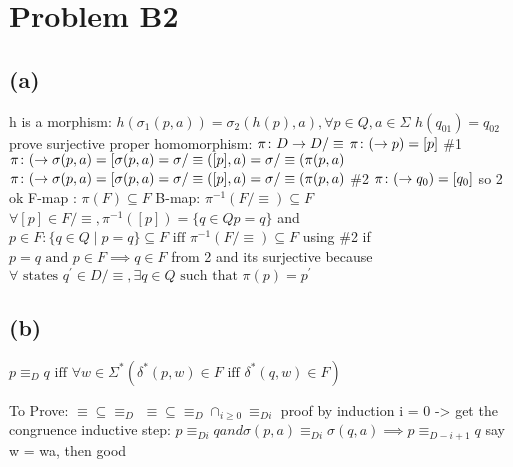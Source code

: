 \documentclass[12pt]{article}
\begin{document}
\section*{Problem B2}
\subsection*{(a)}
h is a morphism:
$h(\sigma_1(p,a)) = \sigma_2(h(p),a), \forall p \in Q, a \in \Sigma$
$h(q_01) = q_02$
prove surjective proper homomorphism:
$\pi\colon D\rightarrow D/\equiv$ \newline
$\pi\colon (\rightarrow p) = [p]$ \newline
\#1 $\pi\colon (\rightarrow \sigma(p, a) = [\sigma(p,a) = \sigma/\equiv([p], a)
= \sigma / \equiv({\pi}(p,a)$ \newline
$\pi\colon (\rightarrow \sigma(p, a) = [\sigma(p,a) = \sigma/\equiv([p], a)
= \sigma / \equiv({\pi}(p,a)$ \newline
\#2 $\pi\colon (\rightarrow q_0) = [q_0]$ so 2 ok \newline
F-map : ${\pi}(F) \subseteq F$ \newline
B-map: ${\pi}^{-1}(F/\equiv) \subseteq F$ \newline
$\forall [p] \in F/\equiv, {\pi}^{-1}([p]) =\{ q \in Q p = q\}$ \newline
and $p \in F : \{q \in Q \mid p = q\} \subseteq F \text{ iff }
{\pi}^{-1}(F/\equiv) \subseteq F$ using \#2 \newline
if $p=q \text{ and } p\in F \implies q \in F$ from 2 \newline
and its surjective because $\forall \text{ states } q^{'} \in D/\equiv,
\exists q \in Q \text{ such that } {\pi}(p) = p^{'}$ \newline

\subsection*{(b)}
$p \equiv_D q \text{ iff } \forall w \in \Sigma^{*}
(\delta^{*}(p,w) \in F \text{ iff } \delta^{*}(q,w) \in F)$

To Prove: $ \equiv \subseteq \equiv_D$
$ \equiv \subseteq \equiv_D \cap_{i \ge 0} \equiv_{Di}$
proof by induction
i = 0 -> get the congruence
inductive step:
$p \equiv_{Di} q and \sigma(p,a) \equiv_{Di} \sigma(q,a) \implies
p \equiv_{D-{i+1}} q$
say w = wa, then good
\end{document}
